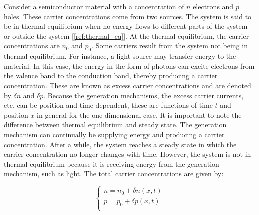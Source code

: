 Consider a semiconductor material with a concentration of $n$ electrons and $p$ holes. These carrier concentrations come from two sources. The system is said to be in thermal equilibrium when no energy flows to different parts of the system or outside the system [\ref{ref:thermal_eq}]. At the thermal equilibrium, the carrier concentrations are $n_0$ and $p_0$.
Some carriers result from the system not being in thermal equilibrium. For instance, a light source may transfer energy to the material. In this case, the energy in the form of photons can excite electrons from the valence band to the conduction band, thereby producing a carrier concentration. These are known as excess carrier concentrations and are denoted by $\delta n$ and $\delta p$. Because the generation mechanisms, the excess carrier currents, etc. can be position and time dependent, these are functions of time $t$ and position $x$ in general for the one-dimensional case.
It is important to note the difference between thermal equilibrium and steady state. The generation mechanism can continually be supplying energy and producing a carrier concentration. After a while, the system reaches a steady state in which the carrier concentration no longer changes with time. However, the system is not in thermal equilibrium because it is receiving energy from the generation mechanism, such as light.
The total carrier concentrations are given by:

\begin{equation}
	\label{eq:carrier_conc}
	\begin{cases}
		n = n_0 + \delta n(x,t) \\
		p = p_0 + \delta p(x,t) \\
	\end{cases}
\end{equation}

